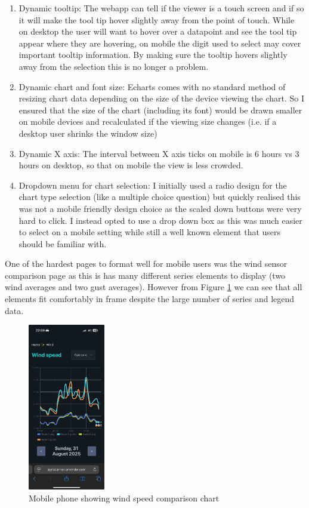 \begin{enumerate}
    \item Dynamic tooltip: The webapp can tell if the viewer is a touch screen
          and if so it will make the tool tip hover slightly away from the point
          of touch. While on desktop the user will want to hover over a
          datapoint and see the tool tip appear where they are hovering, on
          mobile the digit used to select may cover important tooltip
          information. By making sure the tooltip hovers slightly away from the
          selection this is no longer a problem.
    \item Dynamic chart and font size: Echarts comes with no standard method of
          resizing chart data depending on the size of the device viewing the
          chart. So I ensured that the size of the chart (including its font)
          would be drawn smaller on mobile devices and recalculated if the
          viewing size changes (i.e. if a desktop user shrinks the window size)
    \item Dynamic X axis: The interval between X axis ticks on mobile is 6 hours
        vs 3 hours on desktop, so that on mobile the view is less crowded.
    \item Dropdown menu for chart selection: I initially used a radio design for
        the chart type selection (like a multiple choice question) but quickly
        realised this was not a mobile friendly design choice as the scaled down
        buttons were very hard to click. I instead opted to use a drop down box
        as this was much easier to select on a mobile setting while still a well
        known element that users should be familiar with.
\end{enumerate}

One of the hardest pages to format well for mobile users was the wind sensor
comparison page as this is has many different series elements to display (two
wind averages and two gust averages). However from Figure \ref{fig:mobile-page}
we can see that all elements fit comfortably in frame despite the large number
of series and legend data.

\begin{figure}[H]
    \centering
    \includegraphics[width=0.3\textwidth]{contents/part-3/fig3/mobile-wind-speed-compare.jpeg}
    \caption{Mobile phone showing wind speed comparison chart}
    \label{fig:mobile-page}
\end{figure} 


